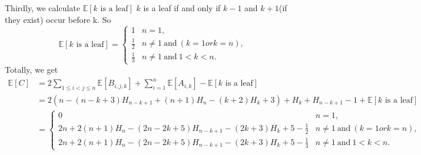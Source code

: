 		 Thirdly, we calculate $\displaystyle \mathbb{E}[k\text{~is~a~leaf}]$
		 $k$ is a leaf if and only if $k - 1$ and $k + 1$(if they exist) occur before k. So
		 \[
			\mathbb{E}[k\text{~is~a~leaf}] = 
			\begin{cases}
				1 & n = 1,\\
				\frac{1}{2} &n \neq 1~\text{and}~(k = 1 or k = n),\\
				\frac{1}{3} &n \neq 1~\text{and}~1 < k < n.
			\end{cases}
		 \]
		 Totally, we get
		 \begin{align*}
			\mathbb{E}[C]	&= 2\sum_{1 \leq i < j \leq n} \mathbb{E}[B_{i,j,k}] + \sum_{i = 1}^{n} \mathbb{E}[A_{i,k}] - \mathbb{E}[k\text{~is~a~leaf}]\\
							&= 2(n-(n-k+3)H_{n-k+1}+(n+1)H_n-(k+2)H_{k}+3) + H_k + H_{n - k + 1} - 1 + \mathbb{E}[k\text{~is~a~leaf}]\\
							&=
							\begin{cases}
								0 & n = 1,\\
								2n + 2(n + 1)H_n - (2n - 2k + 5)H_{n - k + 1} - (2k + 3)H_k + 5 - \frac{1}{2} &n \neq 1~\text{and}~(k = 1 or k = n),\\
								2n + 2(n + 1)H_n - (2n - 2k + 5)H_{n - k + 1} - (2k + 3)H_k + 5 - \frac{1}{3} &n \neq 1~\text{and}~1 < k < n.
							\end{cases}
		\end{align*}